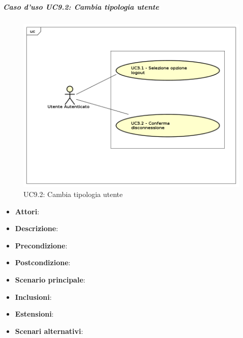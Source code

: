 			\subparagraph{Caso d'uso UC9.2: Cambia tipologia utente}
			\label{UC9.2}
			\begin{figure}[h]
				\centering
			\includegraphics[scale=0.7,keepaspectratio]{UML/UC9.png}
				\caption{UC9.2: Cambia tipologia utente}
			\end{figure}
			\FloatBarrier
			\begin{itemize}
				\item \textbf{Attori}: 
				\item \textbf{Descrizione}: 
				\item \textbf{Precondizione}: 
				\item \textbf{Postcondizione}: 
				\item \textbf{Scenario principale}:
				\item \textbf{Inclusioni}:
				\item \textbf{Estensioni}:
				\item \textbf{Scenari alternativi}:
			\end{itemize}
			
